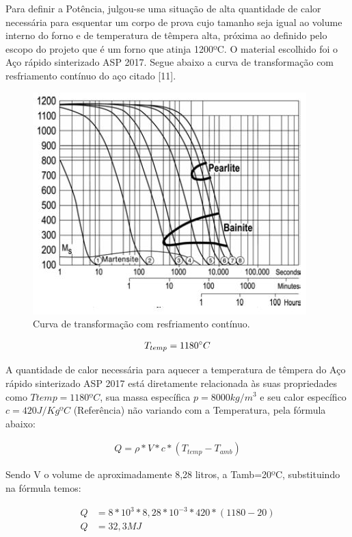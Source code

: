 Para definir a Potência, julgou-se uma situação de alta quantidade de calor necessária para esquentar um corpo de prova cujo tamanho seja igual ao volume interno do forno e de temperatura de têmpera alta, próxima ao definido pelo escopo do projeto que é um forno que atinja 1200ºC. O material escolhido foi o Aço rápido sinterizado ASP 2017. Segue abaixo a curva de transformação com resfriamento contínuo do aço citado [11].
\begin{figure}[!h]
	\centering
	\label{transf_continuo}
	\includegraphics[keepaspectratio=true,scale=0.8]{figuras/transf_continuo.JPG}
	\caption{Curva de transformação com resfriamento contínuo.}
\end{figure}

\begin{align}
	T_{temp} = 1180 \degree C
\end{align}

A quantidade de calor necessária para aquecer a temperatura de têmpera do Aço rápido sinterizado ASP 2017 está diretamente relacionada às suas propriedades como $Ttemp=1180ºC$, sua massa específica $p = 8000 kg/m^{3}$  
e seu calor específico $c = 420 J/KgºC$ (Referência) não variando com a Temperatura, pela fórmula abaixo:

\begin{align}
	Q = \rho * V * c * (T_{temp} - T_{amb})
\end{align}

Sendo V o volume de aproximadamente 8,28 litros, a	 Tamb=20ºC, substituindo na fórmula temos:

\begin{align}
Q &= 8*10^{3}*8,28*10^{-3}*420*(1180-20) \\
\nonumber
Q &= 32,3 MJ
\end{align}

